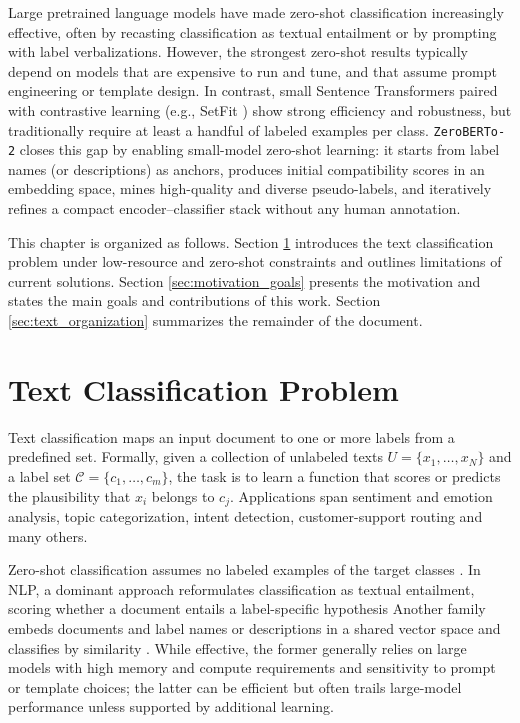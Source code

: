 \documentclass[]{politex-xico}
\begin{document}
Large pretrained language models have made zero-shot classification increasingly effective, often by recasting classification as textual entailment or by prompting with label verbalizations. However, the strongest zero-shot results typically depend on models that are expensive to run and tune, and that assume prompt engineering or template design. In contrast, small Sentence Transformers paired with contrastive learning (e.g., SetFit \cite{setfit}) show strong efficiency and robustness, but traditionally require at least a handful of labeled examples per class. \texttt{ZeroBERTo-2} closes this gap by enabling small-model zero-shot learning: it starts from label names (or descriptions) as anchors, produces initial compatibility scores in an embedding space, mines high-quality and diverse pseudo-labels, and iteratively refines a compact encoder–classifier stack without any human annotation.


This chapter is organized as follows. Section \ref{sec:text_classification_problem} introduces the text classification problem under low-resource and zero-shot constraints and outlines limitations of current solutions. Section \ref{sec:motivation_goals} presents the motivation and states the main goals and contributions of this work. Section \ref{sec:text_organization} summarizes the remainder of the document.

\section{Text Classification Problem}
\label{sec:text_classification_problem}

Text classification maps an input document to one or more labels from a predefined set. Formally, given a collection of unlabeled texts $U=\{x_1,\dots,x_N\}$ and a label set $\mathcal{C}=\{c_1,\dots,c_m\}$, the task is to learn a function that scores or predicts the plausibility that $x_i$ belongs to $c_j$. Applications span sentiment and emotion analysis, topic categorization, intent detection, customer-support routing and many others.



Zero-shot classification assumes no labeled examples of the target classes \cite{yin2019benchmarking}. In NLP, a dominant approach reformulates classification as textual entailment, scoring whether a document entails a label-specific hypothesis \cite{obamuyide2018zero} Another family embeds documents and label names or descriptions in a shared vector space and classifies by similarity \cite{cho2024zero}. While effective, the former generally relies on large models with high memory and compute requirements and sensitivity to prompt or template choices; the latter can be efficient but often trails large-model performance unless supported by additional learning.
\end{document}
